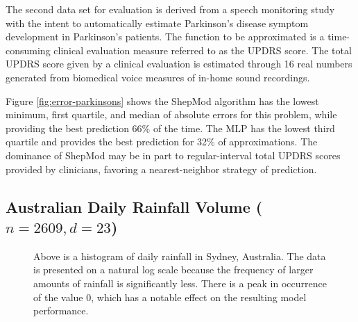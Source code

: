 \documentclass[smallextended,final]{svjour3}       %
\begin{document}
The second data set for evaluation \cite{tsanas2010accurate} is
derived from a speech monitoring study with the intent to
automatically estimate Parkinson's disease symptom development in
Parkinson's patients. The function to be approximated is a
time-consuming clinical evaluation measure referred to as the UPDRS
score. The total UPDRS score given by a clinical evaluation is
estimated through 16 real numbers generated from biomedical voice
measures of in-home sound recordings.

Figure \ref{fig:error-parkinsons} shows the ShepMod algorithm has the
lowest minimum, first quartile, and median of absolute errors for this
problem, while providing the best prediction 66\% of the time. The MLP
has the lowest third quartile and provides the best prediction for
32\% of approximations. The dominance of ShepMod may be in part to
regular-interval total UPDRS scores provided by clinicians, favoring a
nearest-neighbor strategy of prediction.



\subsection{Australian Daily Rainfall Volume ($n = 2609, d = 23$)}

\begin{figure}
  \centering
  \caption{Above is a histogram of daily rainfall in Sydney,
    Australia. The data is presented on a natural log scale because
    the frequency of larger amounts of rainfall is significantly
    less. There is a peak in occurrence of the value $0$, which has a
    notable effect on the resulting model performance.}
  \label{fig:hist-weather}
\end{figure}
\end{document}
